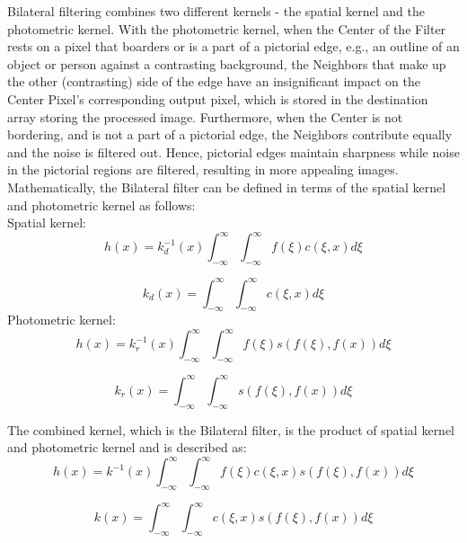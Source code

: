 \documentclass{IEEEtran}
\begin{document}
Bilateral filtering combines two different kernels - the spatial kernel and the photometric kernel. With the photometric kernel, when the Center of the Filter rests on a pixel that boarders or is a part of a pictorial edge, e.g., an outline of an object or person against a contrasting background, the Neighbors that make up the other (contrasting) side of the edge have an insignificant impact on the Center Pixel's corresponding output pixel, which is stored in the destination array storing the processed image. Furthermore, when the Center is not bordering, and is not a part of a pictorial edge, the Neighbors contribute equally and the noise is filtered out. Hence, pictorial edges maintain sharpness while noise in the pictorial regions are filtered, resulting in more appealing images. Mathematically, the Bilateral filter can be defined in terms of the spatial kernel and photometric kernel as follows\cite{Tomasi1998}:\\

Spatial kernel: 
\begin{equation}
h(x)=k_{d}^{-1}(x)\int_{-\infty}^{\infty}\int_{-\infty}^{\infty}f(\xi)c(\xi,x)d\xi\label{spatial}
\end{equation}
 
\begin{equation}
k_{d}(x)=\int_{-\infty}^{\infty}\int_{-\infty}^{\infty}c(\xi,x)d\xi
\end{equation}
 Photometric kernel: 
\begin{equation}
h(x)=k_{r}^{-1}(x)\int_{-\infty}^{\infty}\int_{-\infty}^{\infty}f(\xi)s(f(\xi),f(x))d\xi\label{photometric}
\end{equation}
 
\begin{equation}
k_{r}(x)=\int_{-\infty}^{\infty}\int_{-\infty}^{\infty}s(f(\xi),f(x))d\xi
\end{equation}


The combined kernel, which is the Bilateral filter, is the product
of spatial kernel and photometric kernel and is described as: 
\begin{equation}
h(x)=k^{-1}(x)\int_{-\infty}^{\infty}\int_{-\infty}^{\infty}f(\xi)c(\xi,x)s(f(\xi),f(x))d\xi\label{combined}
\end{equation}
 
\begin{equation}
k(x)=\int_{-\infty}^{\infty}\int_{-\infty}^{\infty}c(\xi,x)s(f(\xi),f(x))d\xi
\end{equation}
\end{document}
